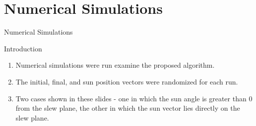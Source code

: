 \documentclass{beamer}
\begin{document}
\section{Numerical Simulations}
\begin{frame}{Numerical Simulations} 
	\begin{block}{Introduction}
		\begin{enumerate}
			\item Numerical simulations were run examine the proposed algorithm. 
			\item The initial, final, and sun position vectors were randomized for each run. 
			\item Two cases shown in these slides - one in which the sun angle is greater than 0 from the slew plane, the other in which the sun vector lies directly on the slew plane. 
		\end{enumerate}
	\end{block}
\end{frame}
\end{document}
